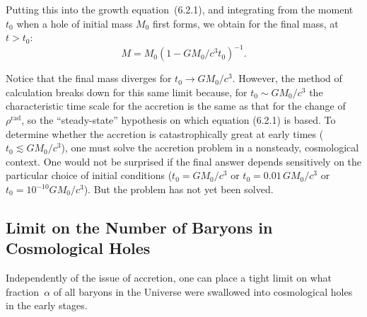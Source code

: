 Putting this into the growth equation~(6.2.1), and integrating from the moment
$t_0$ when a hole of initial mass $M_0$ first forms, we obtain for the final mass, at
$t > t_0$:
%
\begin{equation}
\tag{6.2.2}
M = M_0 (1 - G M_0 / c^3 t_0)^{-1}.
\end{equation}

Notice that the final mass diverges for $t_0 \to GM_0/c^3$.  However, the method of
calculation breaks down for this same limit because, for $t_0 \sim GM_0/c^3$ the
characteristic time scale for the accretion is the same as that for the change of
$\rho^{\text{rad}}$, so the ``steady-state'' hypothesis on which equation
(6.2.1) is based.  To determine whether the accretion is catastrophically great at
early times ($t_0 \lesssim GM_0/c^3$), one must solve the accretion problem in a nonsteady,
cosmological context.  One would not be surprised if the final answer depends
sensitively on the particular choice of initial conditions ($t_0 = GM_0/c^3$ or
$t_0 = 0.01\, GM_0/c^3$ or $t_0 = 10^{-10} GM_0/c^3$).  But the problem has not yet been
solved.


\subsection{Limit on the Number of Baryons in Cosmological Holes}
\label{sec:6.3}

Independently of the issue of accretion, one can place a tight limit on what
fraction~$\alpha$ of all baryons in the Universe were swallowed into cosmological holes
in the early stages.

